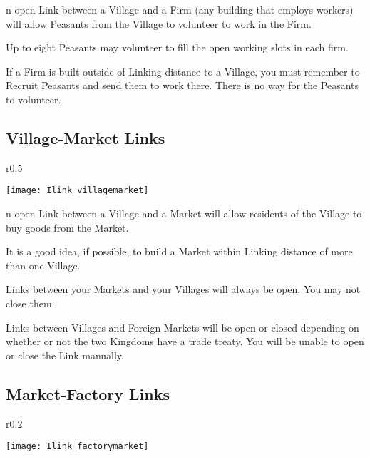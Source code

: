 n open Link between a Village and a Firm (any building that employs workers) will allow Peasants from the Village to volunteer to work in the Firm.

Up to eight Peasants may volunteer to fill the open working slots in each firm.

If a Firm is built outside of Linking distance to a Village, you must remember to Recruit Peasants and send them to work there. There is no way for the Peasants to volunteer.

\subsection{\textsf{Village-Market Links}}


\begin{wrapfigure}{r}{0.5\textwidth}
    \vspace{-20pt}
    \begin{center}
        \texttt{[image: Ilink\_villagemarket]} %
    \end{center}
    \vspace{-20pt}
\end{wrapfigure}

n open Link between a Village and a Market will allow residents of the Village to buy goods from the Market.

It is a good idea, if possible, to build a Market within Linking distance of more than one Village.

Links between your Markets and your Villages will always be open. You may not close them.

Links between Villages and Foreign Markets will be open or closed depending on whether or not the two Kingdoms have a trade treaty. You will be unable to open or close the Link manually.

\subsection{\textsf{Market-Factory Links}}


\begin{wrapfigure}{r}{0.2\textwidth}
    \vspace{-20pt}
    \begin{center}
        \texttt{[image: Ilink\_factorymarket]} %
    \end{center}
    \vspace{-20pt}
\end{wrapfigure}

